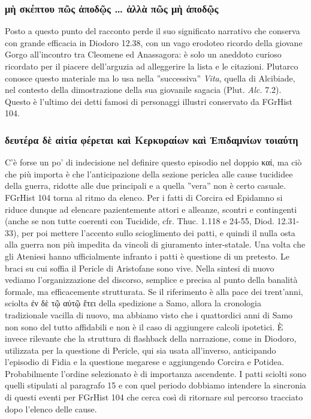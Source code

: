 {            \subsubsection{\textgreek{μὴ σκέπτου πῶς ἀποδῷς … ἀλλὰ πῶς μὴ ἀποδῷς}}
       Posto a questo punto del racconto perde il suo significato narrativo che conserva con grande efficacia in  Diodoro 12.38, con un vago erodoteo ricordo della giovane Gorgo all'incontro tra Cleomene ed Anassagora: è solo un aneddoto curioso ricordato per il piacere dell'arguzia ad alleggerire la lista e le citazioni. Plutarco conosce questo materiale ma lo usa nella ''successiva'' \emph{Vita}, quella di Alcibiade, nel contesto della dimostrazione della sua giovanile sagacia (Plut. \emph{Alc.} 7.2). Questo è l'ultimo dei detti famosi di personaggi illustri conservato da FGrHist 104.
            
            \subsubsection{\textgreek{δευτέρα δὲ αἰτία φέρεται καὶ Κερκυραίων καὶ Ἐπιδαμνίων τοιαύτη}}
            C'è forse un po' di indecisione nel definire questo episodio nel doppio \textgreek{καί}, ma ciò che più importa è che l'anticipazione della sezione periclea alle cause tucididee della guerra, ridotte alle due principali e a quella ''vera'' non è certo casuale. FGrHist 104 torna al ritmo da elenco. Per i fatti di Corcira ed Epidamno si riduce dunque ad elencare pazientemente attori e alleanze, scontri e contingenti  (anche se non tutte coerenti con Tucidide, cfr. Thuc. 1.118 e 24-55, Diod. 12.31-33), per poi mettere l'accento sullo scioglimento dei patti, e quindi il nulla osta alla guerra non più impedita da vincoli di giuramento inter-statale. Una volta che gli Ateniesi hanno ufficialmente infranto i patti è questione di un pretesto. Le braci su cui soffia il Pericle di Aristofane sono vive. Nella sintesi di nuovo vediamo l'organizzazione del discorso, semplice e precisa al punto della banalità formale, ma efficacemente strutturata. Se il riferimento è alla pace dei trent'anni, sciolta \textgreek{ἐν δὲ τῷ αὐτῷ ἔτει} della spedizione a Samo, allora la cronologia tradizionale vacilla di nuovo, ma abbiamo visto che i quattordici anni di Samo non sono del tutto affidabili e non è il caso di aggiungere calcoli ipotetici. È invece rilevante che la struttura di flashback della narrazione, come in Diodoro, utilizzata per la questione di Pericle, qui sia usata all'inverso, anticipando l'episodio di Fidia e la questione megarese e aggiungendo Corcira e Potidea. Probabilmente l'ordine selezionato è di importanza ascendente. I patti sciolti sono quelli stipulati al paragrafo 15 e con quel periodo dobbiamo intendere la sincronia di questi eventi per FGrHist 104 che cerca così di ritornare sul percorso tracciato dopo l'elenco delle cause.
            
}
